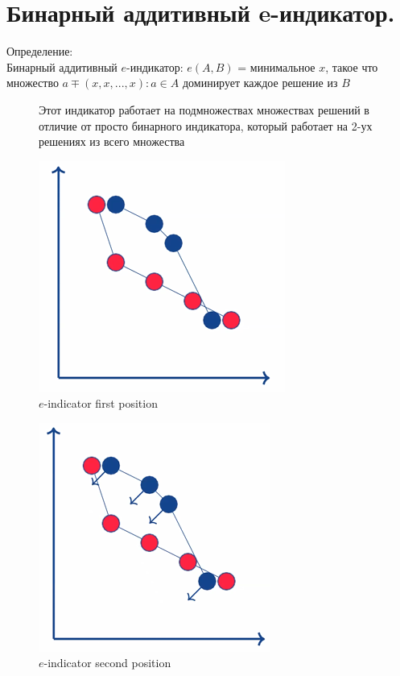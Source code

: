 \section{Бинарный аддитивный e-индикатор.}
Определение:\\
Бинарный аддитивный $e$-индикатор: $e(A, B)$ = минимальное $x$, такое что
множество ${a \mp (x, x,...,x) : a \in A}$ доминирует каждое решение из $B$\\

\begin{figure}[!ht]
Этот индикатор работает на подмножествах множествах решений в отличие от просто бинарного индикатора, который работает на 2-ух решениях из всего множества
\begin{center}
    \includegraphics[width=0.3\linewidth]{images/e-indicator1.PNG}
    \caption{$e$-indicator first position}
    \label{fig:mpr}
    
\end{center}

\end{figure}

\begin{figure}[!ht]

\begin{center}
    \includegraphics[width=0.3\linewidth]{images/e-indicator3.PNG}
    \caption{$e$-indicator second position}
    \label{fig:mpr}
    
\end{center}

\end{figure}

